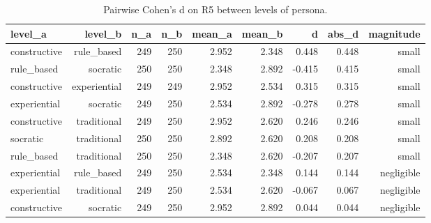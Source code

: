 \begin{table}[htbp]
\centering
\caption{Pairwise Cohen's d on R5 between levels of persona.}
\label{tab:cohensd-persona-R5}
\begin{tabular}{lrrrrrrrr}
\toprule
level\_a & level\_b & n\_a & n\_b & mean\_a & mean\_b & d & abs\_d & magnitude \\
\midrule
constructive & rule\_based & 249 & 250 & 2.952 & 2.348 & 0.448 & 0.448 & small \\
rule\_based & socratic & 250 & 250 & 2.348 & 2.892 & -0.415 & 0.415 & small \\
constructive & experiential & 249 & 249 & 2.952 & 2.534 & 0.315 & 0.315 & small \\
experiential & socratic & 249 & 250 & 2.534 & 2.892 & -0.278 & 0.278 & small \\
constructive & traditional & 249 & 250 & 2.952 & 2.620 & 0.246 & 0.246 & small \\
socratic & traditional & 250 & 250 & 2.892 & 2.620 & 0.208 & 0.208 & small \\
rule\_based & traditional & 250 & 250 & 2.348 & 2.620 & -0.207 & 0.207 & small \\
experiential & rule\_based & 249 & 250 & 2.534 & 2.348 & 0.144 & 0.144 & negligible \\
experiential & traditional & 249 & 250 & 2.534 & 2.620 & -0.067 & 0.067 & negligible \\
constructive & socratic & 249 & 250 & 2.952 & 2.892 & 0.044 & 0.044 & negligible \\
\bottomrule
\end{tabular}
\end{table}
